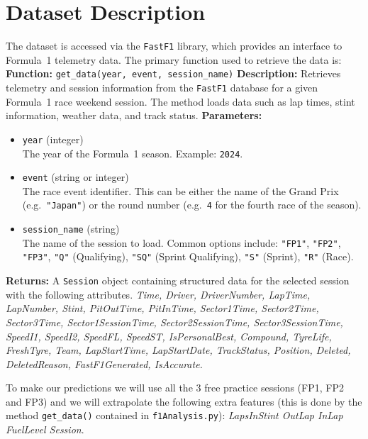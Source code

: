 \documentclass[12pt,a4paper]{article}
\begin{document}
\section{Dataset Description}
The dataset is accessed via the \texttt{FastF1} library, which provides an interface to Formula~1 telemetry data. The primary function used to retrieve the data is:
\\\textbf{Function:} \verb|get_data(year, event, session_name)|
\textbf{Description:}  
Retrieves telemetry and session information from the \texttt{FastF1} database for a given Formula~1 race weekend session. The method loads data such as lap times, stint information, weather data, and track status.
\textbf{Parameters:}
\begin{itemize}
    \item \verb|year| \quad (integer) \\
    The year of the Formula~1 season.  
    Example: \verb|2024|.
    
    \item \verb|event| \quad (string or integer) \\
    The race event identifier. This can be either the name of the Grand Prix (e.g.\ \verb|"Japan"|) or the round number (e.g.\ \verb|4| for the fourth race of the season).
    
    \item \verb|session_name| \quad (string) \\
    The name of the session to load. Common options include:
    \verb|"FP1"|, \verb|"FP2"|, \verb|"FP3"|, \verb|"Q"| (Qualifying), \verb|"SQ"| (Sprint Qualifying), \verb|"S"| (Sprint), \verb|"R"| (Race).
\end{itemize}
\noindent
\textbf{Returns:}  
A \verb|Session| object containing structured data for the selected session with the following attributes.
\textit{
Time,
Driver,
DriverNumber,
LapTime,
LapNumber,
Stint,
PitOutTime,
PitInTime,
Sector1Time,
Sector2Time,
Sector3Time,
Sector1SessionTime,
Sector2SessionTime,
Sector3SessionTime,
SpeedI1,
SpeedI2,
SpeedFL,
SpeedST,
IsPersonalBest,
Compound,
TyreLife,
FreshTyre,
Team,
LapStartTime,
LapStartDate,
TrackStatus,
Position,
Deleted,
DeletedReason,
FastF1Generated,
IsAccurate.
}

\noindent
To make our predictions we will use all the 3 free practice sessions (FP1, FP2 and FP3) and we will extrapolate the following extra features (this is done by the method \verb|get_data()| contained in \texttt{f1Analysis.py}):
\textit{LapsInStint
OutLap
InLap
FuelLevel
Session}.
\end{document}
